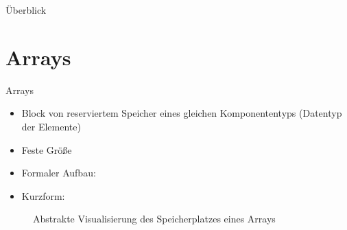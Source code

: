 \documentclass{../tuda-beamer}
\date{10. November 2021}
\begin{document}
    \maketitle

    \begin{frame}{Überblick}
        \tableofcontents
    \end{frame}


    \section{Arrays}
    \begin{frame}{Arrays}
        \begin{itemize}
            \item Block von reserviertem Speicher eines gleichen Komponententyps (Datentyp der
            Elemente)
            \item Feste Größe
            \item Formaler Aufbau: 
            \item Kurzform: 
        \end{itemize}
        \begin{figure}[h]
            \centering
            \begin{memory}[scale=.725]
            \end{memory}
            \caption{Abstrakte Visualisierung des Speicherplatzes eines Arrays }
        \end{figure}
    \end{frame}
\end{document}
